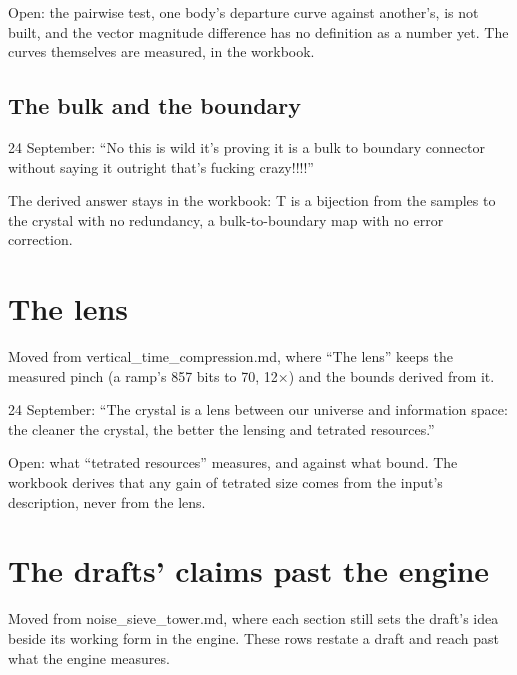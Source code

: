 Open: the pairwise test, one body's departure curve against another's, is not built, and the vector magnitude difference has no definition as a number yet. The curves themselves are measured, in the workbook.

\subsection{\texorpdfstring{The bulk and the boundary}{The bulk and the boundary}}

24 September: “No this is wild it's proving it is a bulk to boundary connector without saying it outright that's fucking crazy!!!!”

The derived answer stays in the workbook: T is a bijection from the samples to the crystal with no redundancy, a bulk-to-boundary map with no error correction.

\section{\texorpdfstring{The lens}{The lens}}

Moved from vertical\_\allowbreak{}time\_\allowbreak{}compression.md, where “The lens” keeps the measured pinch (a ramp's 857 bits to 70, 12×) and the bounds derived from it.

24 September: “The crystal is a lens between our universe and information space: the cleaner the crystal, the better the lensing and tetrated resources.”

Open: what “tetrated resources” measures, and against what bound. The workbook derives that any gain of tetrated size comes from the input's description, never from the lens.

\section{\texorpdfstring{The drafts' claims past the engine}{The drafts' claims past the engine}}

Moved from noise\_\allowbreak{}sieve\_\allowbreak{}tower.md, where each section still sets the draft's idea beside its working form in the engine. These rows restate a draft and reach past what the engine measures.


